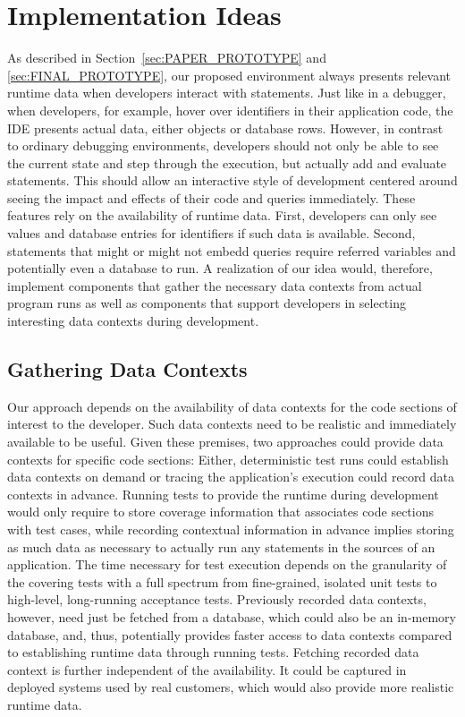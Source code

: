 \section{Implementation Ideas} \label{sec:IMPLEMENTATION_IDEAS}
As described in Section~\ref{sec:PAPER_PROTOTYPE} and \ref{sec:FINAL_PROTOTYPE}, our proposed environment always presents relevant runtime data when developers interact with statements.
Just like in a debugger, when developers, for example, hover over identifiers in their application code, the IDE presents actual data, either objects or database rows.
However, in contrast to ordinary debugging environments, developers should not only be able to see the current state and step through the execution, but actually add and evaluate statements.
This should allow an interactive style of development centered around seeing the impact and effects of their code and queries immediately.
These features rely on the availability of runtime data.
First, developers can only see values and database entries for identifiers if such data is available.
Second, statements that might or might not embedd queries require referred variables and potentially even a database to run.
A realization of our idea would, therefore, implement components that gather the necessary data contexts from actual program runs as well as components that support developers in selecting interesting data contexts during development.

\subsection{Gathering Data Contexts}

Our approach depends on the availability of data contexts for the code sections of interest to the developer.
Such data contexts need to be realistic and immediately available to be useful.
Given these premises, two approaches could provide data contexts for specific code sections:
Either, deterministic test runs could establish data contexts on demand or tracing the application's execution could record data contexts in advance.
Running tests to provide the runtime during development would only require to store coverage information that associates code sections with test cases, while recording contextual information in advance implies storing as much data as necessary to actually run any statements in the sources of an application.
The time necessary for test execution depends on the granularity of the covering tests with a full spectrum from fine-grained, isolated unit tests to high-level, long-running acceptance tests.
Previously recorded data contexts, however, need just be fetched from a database, which could also be an in-memory database, and, thus, potentially provides faster access to data contexts compared to establishing runtime data through running tests.
Fetching recorded data context is further independent of the availability.
It could be captured in deployed systems used by real customers, which would also provide more realistic runtime data.

